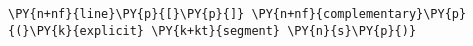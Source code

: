 \begin{Verbatim}[commandchars=\\\{\}]
    \PY{n+nf}{line}\PY{p}{[}\PY{p}{]} \PY{n+nf}{complementary}\PY{p}{(}\PY{k}{explicit} \PY{k+kt}{segment} \PY{n}{s}\PY{p}{)}
\end{Verbatim}
